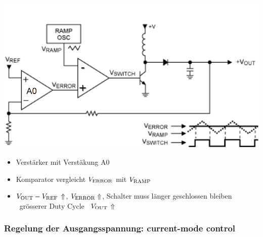 \begin{minipage}{0.42\columnwidth}
    \includegraphics[width=\columnwidth]{images/regelung_ausgangsspannung_voltage.png}
\end{minipage}
\hfill
\begin{minipage}{0.56\columnwidth}
    \begin{itemize}
        \item Verstärker mit Verstäkung A0
        \item Komparator vergleicht $V_{\rm ERROR}$ mit $V_{\rm RAMP}$
        \item $V_{\rm OUT} - V_{\rm REF} \, \Uparrow$,  $V_{\rm ERROR} \Uparrow$, Schalter muss 
            länger geschlossen bleiben\\
            \textrightarrow\ grösserer Duty Cycle \textrightarrow\ $V_{\rm OUT} \, \Uparrow$
    \end{itemize}
\end{minipage}


\subsubsection{Regelung der Ausgangsspannung: current-mode control}


